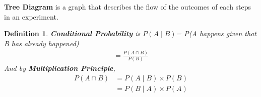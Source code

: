 \documentclass[11pt,oneside]{book}
\theoremstyle{break}
\theoremstyle{break}
\newtheorem{defn}{Definition}[corL]
\begin{document}
	\hfill\\
	\hfill\\
	\textbf{Tree Diagram} is a graph that describes the flow of the outcomes of each steps in an experiment. 
	\begin{defn}
	\textbf{Conditional Probability} is $P(A\mid B)$= P(A happens given that B has already happened)\begin{align*}
	=\frac{P(A\cap B)}{P(B)}
	\end{align*}
	And by \textbf{Multiplication Principle}, \begin{align*}
	P(A\cap B) & = P(A\mid B) \times P(B)\\
	&= P(B\mid A)\times P(A)
	\end{align*}
	\end{defn}
	
\end{document}
